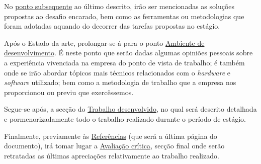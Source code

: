 \documentclass{article}
\begin{document}
\hspace*{0.5cm} No \hyperref[sec:est-art]{ponto subsequente} ao último descrito, irão ser mencionadas as soluções propostas ao desafio encarado, bem como as ferramentas ou metodologias que foram adotadas aquando do decorrer das tarefas propostas no estágio.

\hspace*{0.5cm} Após o Estado da arte, prolongar-se-á para o ponto \hyperref[sec:amb-dev]{Ambiente de desenvolvimento}. É neste ponto que serão dadas algumas opiniões pessoais sobre a experiência vivenciada na empresa do ponto de vista de trabalho; é também onde se irão abordar tópicos mais técnicos relacionados com o \emph{hardware} e \emph{software} utilizado; bem como a metodologia de trabalho que a empresa nos proporcionou ou previu que exercêssemos.

\hspace{0.5cm} Segue-se após, a secção do \hyperref[sec:trab-dev]{Trabalho desenvolvido}, no qual será descrito detalhada e pormenorizadamente todo o trabalho realizado durante o período de estágio.

\hspace{0.5cm} Finalmente, previamente às \hyperref[referencias]{Referências} (que será a última página do documento), irá tomar lugar a \hyperref[sec:ava-crt]{Avaliação crítica}, secção final onde serão retratadas as últimas apreciações relativamente ao trabalho realizado.

\cleardoublepage
\end{document}

